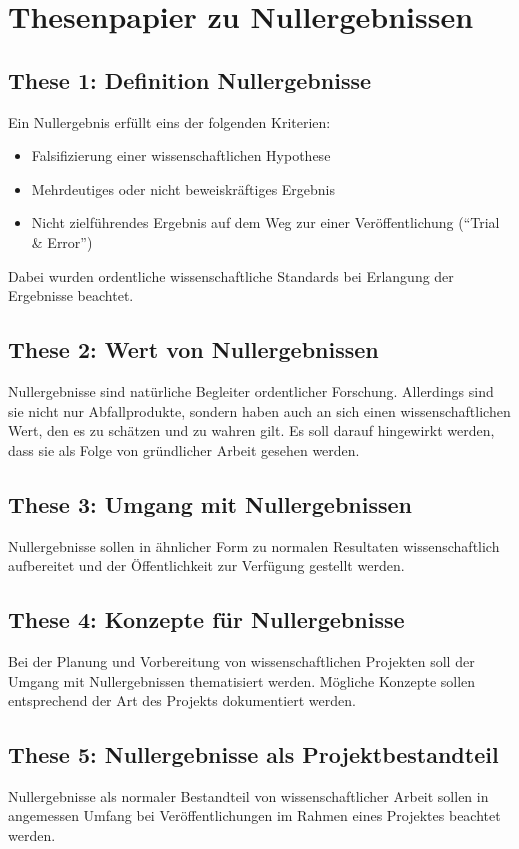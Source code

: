 \documentclass[DIV=9]{scrartcl}
\begin{document}
\section*{Thesenpapier zu Nullergebnissen}


\subsection*{These 1: Definition Nullergebnisse}
Ein Nullergebnis erfüllt eins der folgenden Kriterien:
\begin{itemize}
\item Falsifizierung einer wissenschaftlichen Hypothese
\item Mehrdeutiges oder nicht beweiskräftiges Ergebnis
\item Nicht zielführendes Ergebnis auf dem Weg zur einer Veröffentlichung (``Trial \& Error'')
\end{itemize}
Dabei wurden ordentliche wissenschaftliche Standards bei Erlangung der Ergebnisse beachtet.

\subsection*{These 2: Wert von Nullergebnissen}
Nullergebnisse sind natürliche Begleiter ordentlicher Forschung. Allerdings sind sie nicht nur Abfallprodukte, sondern haben auch an sich einen wissenschaftlichen Wert, den es zu schätzen und zu wahren gilt. Es soll darauf hingewirkt werden, dass sie als Folge von gründlicher Arbeit gesehen werden.

\subsection*{These 3: Umgang mit Nullergebnissen}
Nullergebnisse sollen in ähnlicher Form zu normalen Resultaten wissenschaftlich aufbereitet und der Öffentlichkeit zur Verfügung gestellt werden.

\subsection*{These 4: Konzepte für Nullergebnisse}
Bei der Planung und Vorbereitung von wissenschaftlichen Projekten soll der Umgang mit Nullergebnissen thematisiert werden. Mögliche Konzepte sollen entsprechend der Art des Projekts dokumentiert werden.

\subsection*{These 5: Nullergebnisse als Projektbestandteil}
Nullergebnisse als normaler Bestandteil von wissenschaftlicher Arbeit sollen in angemessen Umfang bei Veröffentlichungen im Rahmen eines Projektes beachtet werden.
\end{document}

